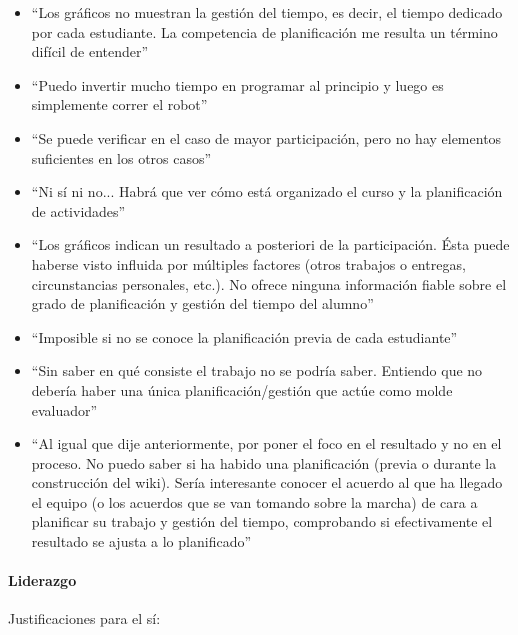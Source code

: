 \begin{itemize}
\item ``Los gráficos no muestran la gestión del tiempo, es decir, el tiempo dedicado por cada estudiante. La competencia de planificación me resulta un término difícil de entender''
\item ``Puedo invertir mucho tiempo en programar al principio y luego es simplemente correr el robot''
\item ``Se puede verificar en el caso de mayor participación, pero no hay elementos suficientes en los otros casos''
\item ``Ni sí ni no... Habrá que ver cómo está organizado el curso y la planificación de actividades''
\item ``Los gráficos indican un resultado a posteriori de la participación. Ésta puede haberse visto influida por múltiples factores (otros trabajos o entregas, circunstancias personales, etc.). No ofrece ninguna información fiable sobre el grado de planificación y gestión del tiempo del alumno''
\item ``Imposible si no se conoce la planificación previa de cada estudiante''
\item ``Sin saber en qué consiste el trabajo no se podría saber. Entiendo que no debería haber una única planificación/gestión que actúe como molde evaluador''
\item ``Al igual que dije anteriormente, por poner el foco en el resultado y no en el proceso. No puedo saber si ha habido una planificación (previa o durante la construcción del wiki). Sería interesante conocer el acuerdo al que ha llegado el equipo (o los acuerdos que se van tomando sobre la marcha) de cara a planificar su trabajo y gestión del tiempo, comprobando si efectivamente el resultado se ajusta a lo planificado''
\end{itemize}

\paragraph*{Liderazgo}

Justificaciones para el sí:

